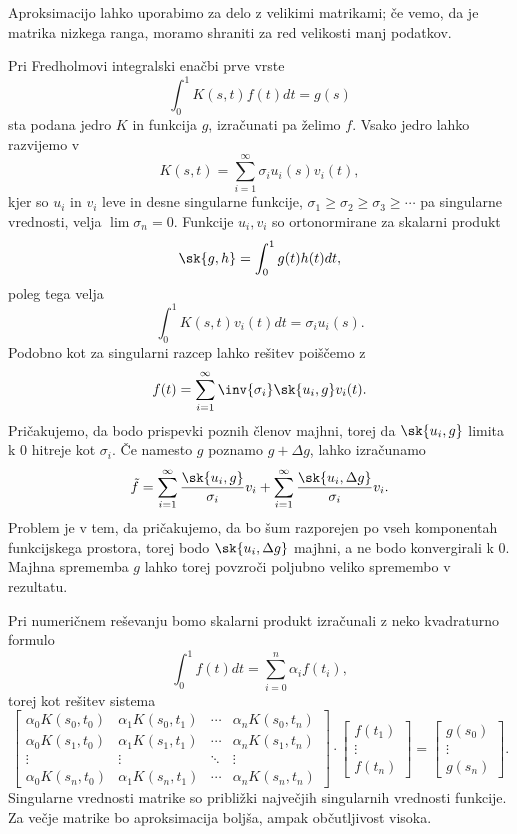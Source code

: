 Aproksimacijo lahko uporabimo za delo z velikimi matrikami; če vemo, da je
matrika nizkega ranga, moramo shraniti za red velikosti manj podatkov.


Pri Fredholmovi integralski enačbi prve vrste
\[
  \int_0^1 K(s,t) f(t) dt = g(s)
\]
sta podana jedro $K$ in funkcija $g$, izračunati pa želimo $f$.
Vsako jedro lahko razvijemo v
\[
  K(s,t) = \sum_{i=1}^\infty \sigma_i u_i(s) v_i(t),
\]
kjer so $u_i$ in $v_i$ leve in desne singularne funkcije, $\sigma_1 \ge \sigma_2
\ge \sigma_3 \ge \cdots$ pa singularne vrednosti, velja $\lim \sigma_n = 0$.
Funkcije $u_i, v_i$ so ortonormirane za skalarni produkt
\[
  \sk{g,h} = \int_0^1 g(t) h(t) dt,
\]
poleg tega velja
\[
  \int_0^1 K(s,t) v_i(t) dt = \sigma_i u_i(s).
\]
Podobno kot za singularni razcep lahko rešitev poiščemo z
\[
  f(t) = \sum_{i=1}^\infty \inv{\sigma_i} \sk{u_i, g} v_i(t).
\]
Pričakujemo, da bodo prispevki poznih členov majhni, torej da $\sk{u_i, g}$
limita k $0$ hitreje kot $\sigma_i$.
Če namesto $g$ poznamo $g + \Delta g$, lahko izračunamo
\[
  \tilde{f} = \sum_{i=1}^\infty \frac{\sk{u_i, g}}{\sigma_i} v_i +
  \sum_{i=1}^\infty \frac{\sk{u_i, \Delta g}}{\sigma_i} v_i.
\]
Problem je v tem, da pričakujemo, da bo šum razporejen po vseh komponentah
funkcijskega prostora, torej bodo $\sk{u_i, \Delta g}$ majhni, a ne bodo
konvergirali k $0$.
Majhna sprememba $g$ lahko torej povzroči poljubno veliko spremembo v rezultatu.

Pri numeričnem reševanju bomo skalarni produkt izračunali z neko kvadraturno
formulo
\[
  \int_0^1 f(t) dt = \sum_{i=0}^n \alpha_i f(t_i),
\]
torej kot rešitev sistema
\[
  \begin{bmatrix}
	\alpha_0 K(s_0, t_0) & \alpha_1 K(s_0, t_1) & \cdots & \alpha_n K(s_0, t_n)
	\\
	\alpha_0 K(s_1, t_0) & \alpha_1 K(s_1, t_1) & \cdots & \alpha_n K(s_1, t_n)
	\\
	\vdots & \vdots & \ddots & \vdots \\
	\alpha_0 K(s_n, t_0) & \alpha_1 K(s_n, t_1) & \cdots & \alpha_n K(s_n, t_n)
  \end{bmatrix}
  \cdot
  \begin{bmatrix}
	f(t_1) \\ \vdots \\ f(t_n)
  \end{bmatrix}
  =
  \begin{bmatrix}
	g(s_0) \\ \vdots \\ g(s_n)
  \end{bmatrix}.
\]
Singularne vrednosti matrike so približki največjih singularnih vrednosti
funkcije.
Za večje matrike bo aproksimacija boljša, ampak občutljivost visoka.

